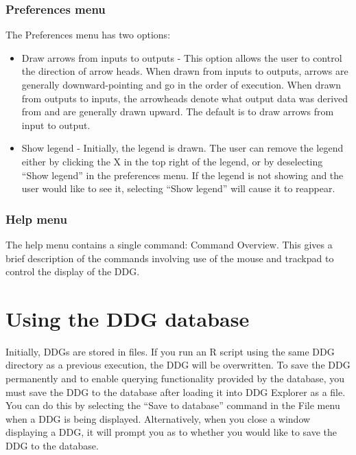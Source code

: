 \documentclass[12pt]{article}
\newcommand\liststyleWWviiiNumii{%
\renewcommand\labelitemi{•}
\renewcommand\labelitemii{•}
\renewcommand\labelitemiii{•}
\renewcommand\labelitemiv{•}
}
\begin{document}
{\subsubsection{Preferences menu}

{\mdseries\upshape\color{black}
The Preferences menu has two options:}

\liststyleWWviiiNumii
\begin{itemize}
\item {\color{black}
Draw arrows from inputs to outputs - This option allows the user to control the direction of arrow heads. When drawn from inputs to outputs, arrows are generally downward-pointing and go in the order of execution. When drawn from outputs to inputs, the arrowheads denote what output data was derived from and are generally drawn upward. The default is to draw arrows from input to output.}
\item {\color{black}
Show legend - Initially, the legend is drawn. The user can remove the legend either by clicking the X in the top right of the legend, or by deselecting “Show legend” in the preferences menu. If the legend is not showing and the user would like to see it, selecting “Show legend” will cause it to reappear.}
\end{itemize}
\subsubsection{Help menu}

{\mdseries\upshape\color{black}
The help menu contains a single command: Command Overview. This gives a brief description of the commands involving use of the mouse and trackpad to control the display of the DDG.}

\section[Using the DDG database]{Using the DDG database}
{\mdseries\upshape\color{black}
Initially, DDGs are stored in files. If you run an R script using the same DDG directory as a previous execution, the DDG will be overwritten. To save the DDG permanently and to enable querying functionality provided by the database, you must save the DDG to the database after loading it into DDG Explorer as a file. You can do this by selecting the “Save to database” command in the File menu when a DDG is being displayed. Alternatively, when you close a window displaying a DDG, it will prompt you as to whether you would like to save the DDG to the database. }

}
\end{document}
